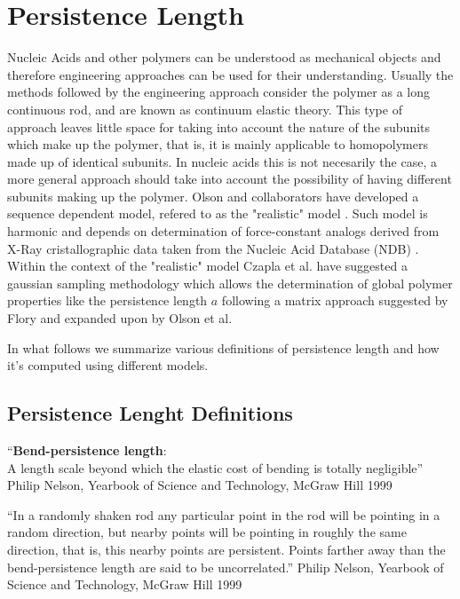 \chapter{Persistence Length}
\label{appendix4a}

Nucleic  Acids and  other  polymers can  be  understood as  mechanical
objects   \cite{marko2003,  nelson2004}   and   therefore  engineering
approaches can  be used for their understanding.   Usually the methods
followed by  the engineering approach  consider the polymer as  a long
continuous rod, and  are known as continuum elastic  theory. This type
of approach leaves little space  for taking into account the nature of
the  subunits  which  make up  the  polymer,  that  is, it  is  mainly
applicable to  homopolymers made up of identical  subunits. In nucleic
acids this is not necesarily  the case, a more general approach should
take into account the  possibility of having different subunits making
up  the polymer.  Olson  and collaborators  have developed  a sequence
dependent model, refered to as the "realistic" model \cite{olson1993}.
Such model is harmonic  and depends on determination of force-constant
analogs  derived  from  X-Ray  cristallographic data  taken  from  the
Nucleic  Acid  Database  (NDB)  \cite{go1976, olson1998}.  Within  the
context of the "realistic" model Czapla et al.  \cite{czapla2006} have
suggested   a   gaussian  sampling   methodology   which  allows   the
determination of global polymer properties like the persistence length
$a$ following  a matrix  approach suggested by  Flory \cite{flory1969}
and expanded upon by Olson et al. \cite{maroun1998, marky1994}

In what follows we summarize various definitions of persistence length
and how it's computed using different models.
\section{Persistence Lenght Definitions}

``\textbf{Bend-persistence length}:\\ 
A length scale beyond which the elastic cost of bending is totally
negligible'' Philip Nelson, Yearbook of Science and Technology, McGraw
Hill 1999

``In a randomly shaken rod any particular point in the rod will be
pointing in a random direction, but nearby points will be pointing in
roughly the same direction, that is, this nearby points are
persistent. Points farther away than the bend-persistence length are
said to be uncorrelated.'' Philip Nelson, Yearbook of Science and
Technology, McGraw Hill 1999

